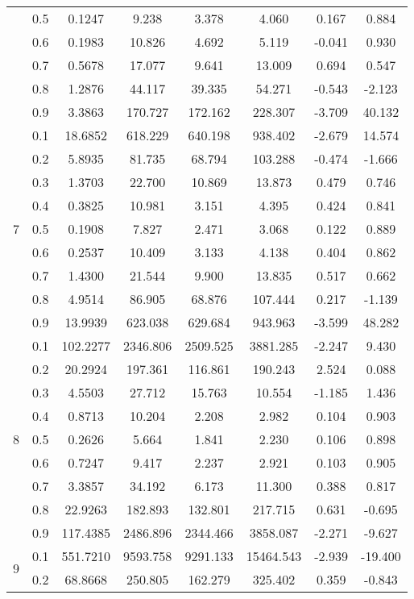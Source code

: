 \documentclass[11pt,a4paper]{report}
\begin{document}
\begin{longtable}{ | c | c || c | c | c | c | c | c | }
 & 0.5 & 0.1247 & 9.238 & 3.378 & 4.060 & 0.167 & 0.884 \\
 & 0.6 & 0.1983 & 10.826 & 4.692 & 5.119 & -0.041 & 0.930 \\
 & 0.7 & 0.5678 & 17.077 & 9.641 & 13.009 & 0.694 & 0.547 \\
 & 0.8 & 1.2876 & 44.117 & 39.335 & 54.271 & -0.543 & -2.123 \\
 & 0.9 & 3.3863 & 170.727 & 172.162 & 228.307 & -3.709 & 40.132 \\
 \hline
\multirow{9}{*}{7} & 0.1 & 18.6852 & 618.229 & 640.198 & 938.402 & -2.679 & 14.574 \\
 & 0.2 & 5.8935 & 81.735 & 68.794 & 103.288 & -0.474 & -1.666 \\
 & 0.3 & 1.3703 & 22.700 & 10.869 & 13.873 & 0.479 & 0.746 \\
 & 0.4 & 0.3825 & 10.981 & 3.151 & 4.395 & 0.424 & 0.841 \\
 & 0.5 & 0.1908 & 7.827 & 2.471 & 3.068 & 0.122 & 0.889 \\
 & 0.6 & 0.2537 & 10.409 & 3.133 & 4.138 & 0.404 & 0.862 \\
 & 0.7 & 1.4300 & 21.544 & 9.900 & 13.835 & 0.517 & 0.662 \\
 & 0.8 & 4.9514 & 86.905 & 68.876 & 107.444 & 0.217 & -1.139 \\
 & 0.9 & 13.9939 & 623.038 & 629.684 & 943.963 & -3.599 & 48.282 \\
 \hline
\multirow{9}{*}{8} & 0.1 & 102.2277 & 2346.806 & 2509.525 & 3881.285 & -2.247 & 9.430 \\
 & 0.2 & 20.2924 & 197.361 & 116.861 & 190.243 & 2.524 & 0.088 \\
 & 0.3 & 4.5503 & 27.712 & 15.763 & 10.554 & -1.185 & 1.436 \\
 & 0.4 & 0.8713 & 10.204 & 2.208 & 2.982 & 0.104 & 0.903 \\
 & 0.5 & 0.2626 & 5.664 & 1.841 & 2.230 & 0.106 & 0.898 \\
 & 0.6 & 0.7247 & 9.417 & 2.237 & 2.921 & 0.103 & 0.905 \\
 & 0.7 & 3.3857 & 34.192 & 6.173 & 11.300 & 0.388 & 0.817 \\
 & 0.8 & 22.9263 & 182.893 & 132.801 & 217.715 & 0.631 & -0.695 \\
 & 0.9 & 117.4385 & 2486.896 & 2344.466 & 3858.087 & -2.271 & -9.627 \\
 \hline
\multirow{9}{*}{9} & 0.1 & 551.7210 & 9593.758 & 9291.133 & 15464.543 & -2.939 & -19.400 \\
 & 0.2 & 68.8668 & 250.805 & 162.279 & 325.402 & 0.359 & -0.843 \\

\end{longtable}
\end{document}
